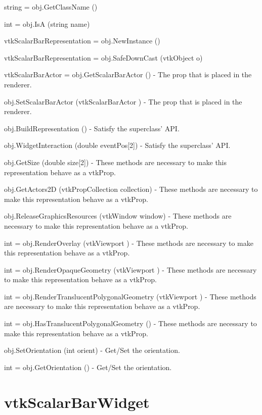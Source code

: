 \begin{DoxyItemize}
\item {\ttfamily string = obj.\-Get\-Class\-Name ()}  
\item {\ttfamily int = obj.\-Is\-A (string name)}  
\item {\ttfamily vtk\-Scalar\-Bar\-Representation = obj.\-New\-Instance ()}  
\item {\ttfamily vtk\-Scalar\-Bar\-Representation = obj.\-Safe\-Down\-Cast (vtk\-Object o)}  
\item {\ttfamily vtk\-Scalar\-Bar\-Actor = obj.\-Get\-Scalar\-Bar\-Actor ()} -\/ The prop that is placed in the renderer.  
\item {\ttfamily obj.\-Set\-Scalar\-Bar\-Actor (vtk\-Scalar\-Bar\-Actor )} -\/ The prop that is placed in the renderer.  
\item {\ttfamily obj.\-Build\-Representation ()} -\/ Satisfy the superclass' A\-P\-I.  
\item {\ttfamily obj.\-Widget\-Interaction (double event\-Pos\mbox{[}2\mbox{]})} -\/ Satisfy the superclass' A\-P\-I.  
\item {\ttfamily obj.\-Get\-Size (double size\mbox{[}2\mbox{]})} -\/ These methods are necessary to make this representation behave as a vtk\-Prop.  
\item {\ttfamily obj.\-Get\-Actors2\-D (vtk\-Prop\-Collection collection)} -\/ These methods are necessary to make this representation behave as a vtk\-Prop.  
\item {\ttfamily obj.\-Release\-Graphics\-Resources (vtk\-Window window)} -\/ These methods are necessary to make this representation behave as a vtk\-Prop.  
\item {\ttfamily int = obj.\-Render\-Overlay (vtk\-Viewport )} -\/ These methods are necessary to make this representation behave as a vtk\-Prop.  
\item {\ttfamily int = obj.\-Render\-Opaque\-Geometry (vtk\-Viewport )} -\/ These methods are necessary to make this representation behave as a vtk\-Prop.  
\item {\ttfamily int = obj.\-Render\-Translucent\-Polygonal\-Geometry (vtk\-Viewport )} -\/ These methods are necessary to make this representation behave as a vtk\-Prop.  
\item {\ttfamily int = obj.\-Has\-Translucent\-Polygonal\-Geometry ()} -\/ These methods are necessary to make this representation behave as a vtk\-Prop.  
\item {\ttfamily obj.\-Set\-Orientation (int orient)} -\/ Get/\-Set the orientation.  
\item {\ttfamily int = obj.\-Get\-Orientation ()} -\/ Get/\-Set the orientation.  
\end{DoxyItemize}\hypertarget{vtkwidgets_vtkscalarbarwidget}{}\section{vtk\-Scalar\-Bar\-Widget}\label{vtkwidgets_vtkscalarbarwidget}
